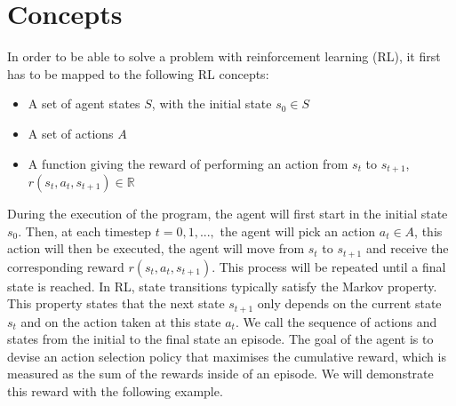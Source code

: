 \section{Concepts}
In order to be able to solve a problem with reinforcement learning (RL), it first has to be mapped to the following RL concepts:
\begin{itemize}
	\item A set of agent states $S$, with the initial state $s_0\in S$
	\item A set of actions $A$
	\item A function giving the reward of performing an action from  $s_t$ to $s_{t+1}$, $r(s_t,a_t,s_{t+1})\in \mathbb{R}$
\end{itemize}
During the execution of the program, the agent will first start in the initial state $s_0$. Then, at each timestep $t=0,1,...,$ the agent will pick an action $a_t \in A$, this action will then be executed, the agent will move from $s_t$ to $s_{t+1}$ and receive the corresponding reward $r(s_t,a_t,s_{t+1})$. This process will be repeated until a final state is reached. In RL, state transitions typically satisfy the Markov property. This property states that the next state $s_{t+1}$ only depends on the current state $s_t$ and on the action taken at this state $a_t$. We call the sequence of actions and states from the initial to the final state an episode. The goal of the agent is to devise an action selection policy that maximises the cumulative reward, which is measured as the sum of the rewards inside of an episode. We will demonstrate this reward with the following example.

